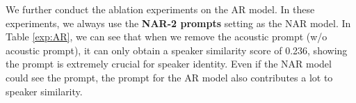 \documentclass{article}
\theoremstyle{plain}
\theoremstyle{definition}
\theoremstyle{remark}
\begin{document}
We further conduct the ablation experiments on the AR model. In these experiments, we always use the \textbf{NAR-2 prompts} setting as the NAR model.   In Table \ref{exp:AR}, we can see that when we remove the acoustic prompt (w/o acoustic prompt), it can only obtain a speaker similarity score of 0.236, showing the prompt is extremely crucial for speaker identity. Even if the NAR model could see the prompt, the prompt for the AR model also contributes a lot to speaker similarity.  
\end{document}
